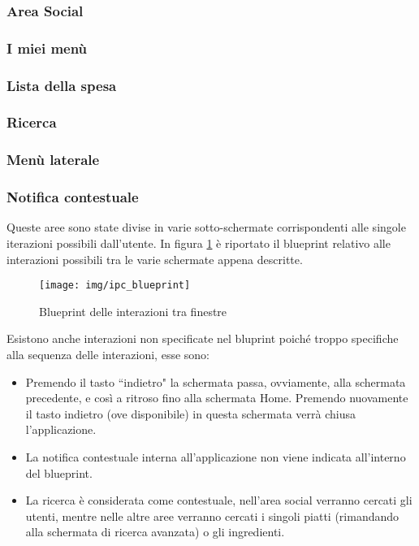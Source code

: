 \subsubsection{Area Social}
\subsubsection{I miei menù}
\subsubsection{Lista della spesa}
\subsubsection{Ricerca}
\subsubsection{Menù laterale}
\subsubsection{Notifica contestuale}

Queste aree sono state divise in varie sotto-schermate corrispondenti alle
singole iterazioni possibili dall'utente.  In figura \ref{fig:blueprint}
è riportato il blueprint relativo alle interazioni possibili tra le varie schermate appena descritte.
\begin{figure}[H]
	\centering
	\caption{Blueprint delle interazioni tra finestre}
	\texttt{[image: img/ipc\_blueprint]}
	\label{fig:blueprint}
\end{figure}
Esistono anche interazioni non specificate nel bluprint poiché troppo specifiche
alla sequenza delle interazioni, esse sono:
\begin{itemize}
	\item Premendo il tasto ``indietro" la schermata passa, ovviamente, alla
	schermata precedente, e così a ritroso fino alla schermata Home.
	Premendo nuovamente il tasto indietro (ove disponibile) in questa
	schermata verrà chiusa l'applicazione.
	\item La notifica contestuale interna all'applicazione non viene
	indicata all'interno del blueprint.
	\item La ricerca è considerata come contestuale, nell'area social
	verranno cercati gli utenti, mentre nelle altre aree verranno cercati i
	singoli piatti (rimandando alla schermata di ricerca avanzata)
	o gli ingredienti.
\end{itemize}
